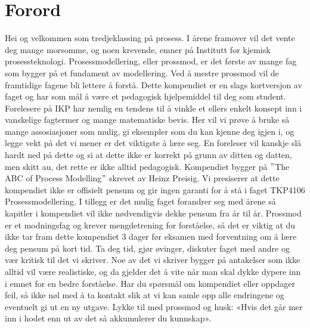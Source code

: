 \section{Forord}\label{sec:forord} 
Hei og velkommen som tredjeklassing på prosess. I årene framover vil det vente deg mange morsomme, og noen krevende, emner på Institutt for kjemisk prosessteknologi. Prosessmodellering, eller prossmod, er det første av mange fag som bygger på et fundament av modellering. Ved å mestre prossmod vil de framtidige fagene bli lettere å forstå. Dette kompendiet er en slags kortversjon av faget og har som mål å være et pedagogisk hjelpemiddel til deg som student. Forelesere på IKP har nemlig en tendens til å vinkle et ellers enkelt konsept inn i vanskelige fagtermer og mange matematiske bevis. Her vil vi prøve å bruke så mange assosiasjoner som mulig, gi eksempler som du kan kjenne deg igjen i, og legge vekt på det vi mener er det viktigste å lære seg. En foreleser vil kanskje slå hardt ned på dette og si at dette ikke er korrekt på grunn av ditten og datten, men skitt au, det rette er ikke alltid pedagogisk. Kompendiet bygger på $"$The ABC of Process Modelling$"$ skrevet av Heinz Preisig. Vi presiserer at dette kompendiet ikke er offisielt pensum og gir ingen garanti for å stå i faget TKP4106 Prosessmodellering. I tillegg er det mulig faget forandrer seg med årene så kapitler i kompendiet vil ikke nødvendigvis dekke pensum fra år til år. Prossmod er et modningsfag og krever mengdetrening for forståelse, så det er viktig at du ikke tar fram dette kompendiet 3 dager før eksamen med forventning om å lære deg pensum på kort tid. Ta deg tid, gjør øvinger, diskuter faget med andre og vær kritisk til det vi skriver. Noe av det vi skriver bygger på antakelser som ikke alltid vil være realistiske, og da gjelder det å vite når man skal dykke dypere inn i emnet for en bedre forståelse. Har du spørsmål om kompendiet eller oppdager feil, så ikke nøl med å ta kontakt slik at vi kan samle opp alle endringene og eventuelt gi ut en ny utgave. Lykke til med prossmod og husk: «Hvis det går mer inn i hodet enn ut av det så akkumulerer du kunnskap». 

\setcounter{page}{1}
\clearpage
